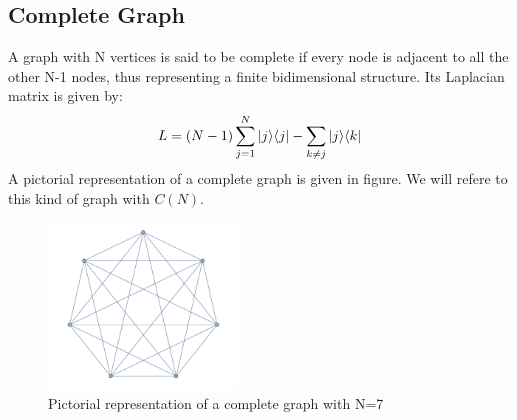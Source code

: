     \subsection*{Complete Graph}
        A graph with N vertices is said to be complete if every node is adjacent to all the other N-1 nodes, thus representing a finite bidimensional structure. Its Laplacian matrix is given by:
        \begin{equation}
            L = (N-1)\sum_{j=1}^{N}{|{j}\rangle}{\langle{j}|} - \sum_{k\neq j}{|{j}\rangle}{\langle{k}|}
        \end{equation}
        A pictorial representation of a complete graph is given in figure. We will refere to this kind of graph with $C(N)$.
        \begin{figure}[hb]
          \centering
          \includegraphics[width=50mm]{./figures/chapter1/complete}
          \caption[Pictorial representation of a complete graph]{Pictorial representation of a complete graph with N=7}
        \end{figure}

